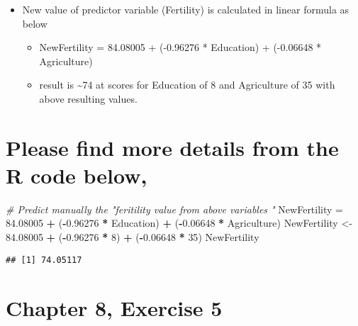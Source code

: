 \documentclass[]{article}
\newenvironment{Shaded}{\begin{snugshade}}{\end{snugshade}}
\newcommand{\CommentTok}[1]{\textcolor[rgb]{0.56,0.35,0.01}{\textit{#1}}}
\newcommand{\DecValTok}[1]{\textcolor[rgb]{0.00,0.00,0.81}{#1}}
\newcommand{\FloatTok}[1]{\textcolor[rgb]{0.00,0.00,0.81}{#1}}
\newcommand{\NormalTok}[1]{#1}
\newcommand{\OperatorTok}[1]{\textcolor[rgb]{0.81,0.36,0.00}{\textbf{#1}}}
\newcommand{\StringTok}[1]{\textcolor[rgb]{0.31,0.60,0.02}{#1}}
\providecommand{\tightlist}{%
  \setlength{\itemsep}{0pt}\setlength{\parskip}{0pt}}
\begin{document}
\begin{itemize}
\tightlist
\item
  New value of predictor variable (Fertility) is calculated in linear
  formula as below

  \begin{itemize}
  \tightlist
  \item
    NewFertility = 84.08005 + (-0.96276 * Education) + (-0.06648 *
    Agriculture)
  \item
    result is \textasciitilde{}74 at scores for Education of 8 and
    Agriculture of 35 with above resulting values.
  \end{itemize}
\end{itemize}

\hypertarget{please-find-more-details-from-the-r-code-below-2}{%
\section{Please find more details from the R code
below,}\label{please-find-more-details-from-the-r-code-below-2}}

\begin{Shaded}
\begin{Highlighting}[]
\CommentTok{# Predict manually the "feritility value from above variables "}
\NormalTok{NewFertility =}\StringTok{ }\FloatTok{84.08005} \OperatorTok{+}\StringTok{ }\NormalTok{(}\OperatorTok{-}\FloatTok{0.96276} \OperatorTok{*}\StringTok{ }\NormalTok{Education) }\OperatorTok{+}\StringTok{ }\NormalTok{(}\OperatorTok{-}\FloatTok{0.06648} \OperatorTok{*}\StringTok{ }\NormalTok{Agriculture)}
\NormalTok{NewFertility <-}\StringTok{ }\FloatTok{84.08005} \OperatorTok{+}\StringTok{ }\NormalTok{(}\OperatorTok{-}\FloatTok{0.96276} \OperatorTok{*}\StringTok{ }\DecValTok{8}\NormalTok{) }\OperatorTok{+}\StringTok{ }\NormalTok{(}\OperatorTok{-}\FloatTok{0.06648} \OperatorTok{*}\StringTok{ }\DecValTok{35}\NormalTok{)}
\NormalTok{NewFertility}
\end{Highlighting}
\end{Shaded}

\begin{verbatim}
## [1] 74.05117
\end{verbatim}

\hypertarget{chapter-8-exercise-5}{%
\section{Chapter 8, Exercise 5}\label{chapter-8-exercise-5}}
\end{document}
